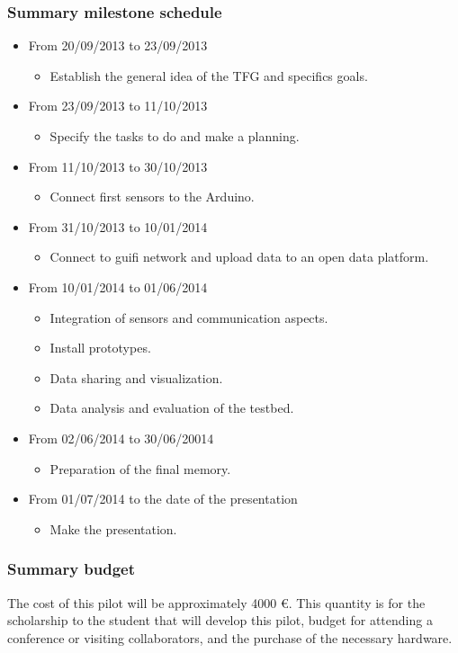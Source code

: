 \documentclass[draftclsnofoot,12pt,journal,onecolumn]{IEEEtran}
\begin{document}
\subsubsection{Summary milestone schedule}
\begin{itemize}
\item From 20/09/2013 to 23/09/2013
	\begin{itemize}
	\item Establish the general idea of the TFG and specifics goals.
	\end{itemize}
\item From 23/09/2013 to 11/10/2013
	\begin{itemize}
	\item Specify the tasks to do and make a planning.
	\end{itemize}
\item From 11/10/2013 to 30/10/2013
	\begin{itemize}
	\item Connect first sensors to the Arduino.
	\end{itemize}
\item From 31/10/2013 to 10/01/2014
	\begin{itemize}
	\item Connect to guifi network and upload data to an open data platform.
	\end{itemize}
\item From 10/01/2014 to 01/06/2014
	\begin{itemize}
	\item Integration of sensors and communication aspects.
	\item Install prototypes.
	\item Data sharing and visualization.
    \item Data analysis and evaluation of the testbed.
	\end{itemize}
\item From 02/06/2014 to 30/06/20014
	\begin{itemize}
	\item Preparation of the final memory.
	\end{itemize}
\item From 01/07/2014 to the date of the presentation
	\begin{itemize}
	\item Make the presentation.
	\end{itemize}
\end{itemize}

\subsubsection{Summary budget}
The cost of this pilot will be approximately 4000 €. This quantity is for the scholarship to the student that will develop this pilot, budget for attending a conference or visiting collaborators, and the purchase of the necessary hardware.
\end{document}
